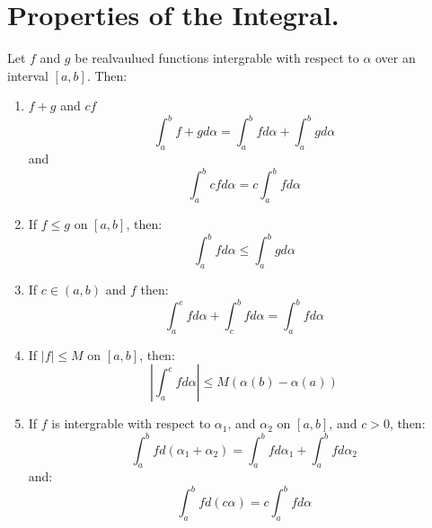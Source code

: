 
\section{Properties of the Integral.}

\begin{theorem}\label{7.2.1}
    Let $f$ and  $g$ be realvaulued functions intergrable with respect to
    $\alpha$ over  an interval $[a,b]$. Then:
        \begin{enumerate}[label=(\arabic*)]
            \item $f+g$ and  $cf$
                    \begin{equation}
                        \int_{a}^{b}{f+g}d\alpha =
                        \int_{a}^{b}{f}d\alpha+\int_{a}^{b}{g}d\alpha
                    \end{equation}
                and 
                    \begin{equation}
                        \int_{a}^{b}{cf} d\alpha=c\int_{a}^{b}{f} d\alpha		
                    \end{equation} 

            \item If $f \leq g$ on  $[a,b]$, then:
                    \begin{equation}
                        \int_{a}^{b}{f} d\alpha \leq \int_{a}^{b}{g d\alpha}		
                    \end{equation} 

            \item If $c \in (a,b)$ and  $f$  then:
                    \begin{equation}
                        \int_{a}^{c}{f} d\alpha+\int_{c}^{b}{f} d\alpha=\int_{a}^{b}{f} d\alpha
                    \end{equation}

            \item If $|f| \leq M$ on  $[a,b]$, then:
                    \begin{equation}
                        |\int_{a}^{c}{f} d\alpha| \leq M(\alpha(b)-\alpha(a))
                    \end{equation}
            \item If $f$ is intergrable with respect to  $\alpha_1$, and
                $\alpha_2$ on $[a,b]$, and $c>0$, then:
                    \begin{equation}
                        \int_{a}^{b}{f} d(\alpha_1+\alpha_2)=\int_{a}^{b}{f}
                        d\alpha_1+\int_{a}^{b}{f} d\alpha_2 
                    \end{equation} 
                and:
                    \begin{equation}
                        \int_{a}^{b}{f} d(c\alpha)=c\int_{a}^{b}{f} d\alpha 		
                    \end{equation} 
        \end{enumerate}
\end{theorem}


